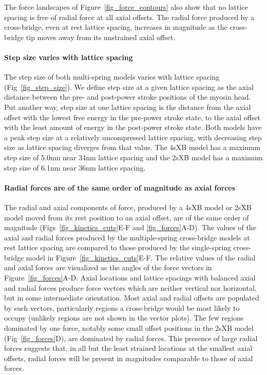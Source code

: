\documentclass[10pt]{article}
\begin{document}
The force landscapes of Figure~\ref{fig_force_contours} also show that no lattice spacing is free of radial force at all axial offsets.  
The radial force produced by a cross-bridge, even at rest lattice spacing, increases in magnitude as the cross-bridge tip moves away from its unstrained axial offset. 

\paragraph{Step size varies with lattice spacing} %
The step size of both multi-spring models varies with lattice spacing (Fig~\ref{fig_step_size}). 
We define step size at a given lattice spacing as the axial distance between the pre- and post-power stroke positions of the myosin head. 
Put another way, step size at one lattice spacing is the distance from the axial offset with the lowest free energy in the pre-power stroke state, to the axial offset with the least amount of energy in the post-power stroke state. 
Both models have a peak step size at a relatively uncompressed lattice spacing, with decreasing step size as lattice spacing diverges from that value. 
The 4sXB model has a maximum step size of 5.0nm near 34nm lattice spacing and the 2sXB model has a maximum step size of 6.1nm near 36nm lattice spacing. 

\paragraph{Radial forces are of the same order of magnitude as axial forces} %
The radial and axial components of force, produced by a 4sXB model or 2sXB model moved from its rest position to an axial offset, are of the same order of magnitude (Figs~\ref{fig_kinetics_cuts}E-F and \ref{fig_forces}A-D). 
The values of the axial and radial forces produced by the multiple-spring cross-bridge models at rest lattice spacing are compared to those produced by the single-spring cross-bridge model in Figure~\ref{fig_kinetics_cuts}E-F.
The relative values of the radial and axial forces are visualized as the angles of the force vectors in Figure~\ref{fig_forces}A-D. 
Axial locations and lattice spacings with balanced axial and radial forces produce force vectors which are neither vertical nor horizontal, but in some intermediate orientation.
Most axial and radial offsets are populated by such vectors, particularly regions a cross-bridge would be most likely to occupy (unlikely regions are not shown in the vector plots). 
The few regions dominated by one force, notably some small offset positions in the 2sXB model (Fig~\ref{fig_forces}D), are dominated by radial forces.
This presence of large radial forces suggests that, in all but the least strained locations at the smallest axial offsets, radial forces will be present in magnitudes comparable to those of axial forces. 
\end{document}
